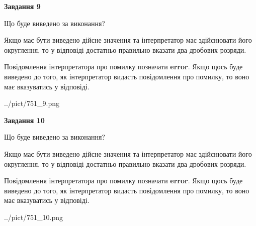 \documentclass[12pt, ukrainian]{article}
\begin{document}
{\begin {Large}
{\begin {center}\textbf{Завдання 9}\end {center}}\par
Що буде виведено за виконання? \par

Якщо має бути виведено дійсне значення та інтерпретатор має здійснювати його округлення, 
то у відповіді достатньо правильно вказати два дробових розряди.

Повідомлення інтерпретатора про помилку позначати \textbf{error}.
Якщо щось буде виведено до того, як інтерпретатор видасть повідомлення про помилку, 
то воно має вказуватись у відповіді. \par

\begin{center}
	{../pict/751_9.png}
\end{center}
\newpage

{\begin {center}\textbf{Завдання 10}\end {center}}\par
Що буде виведено за виконання? \par

Якщо має бути виведено дійсне значення та інтерпретатор має здійснювати його округлення, 
то у відповіді достатньо правильно вказати два дробових розряди.

Повідомлення інтерпретатора про помилку позначати \textbf{error}.
Якщо щось буде виведено до того, як інтерпретатор видасть повідомлення про помилку, 
то воно має вказуватись у відповіді. \par

\begin{center}
	{../pict/751_10.png}
\end{center}
\newpage

\end {Large}}
\end{document}
